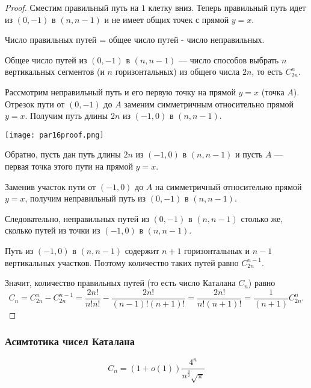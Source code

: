 \begin{proof}

    Сместим правильный путь на $1$ клетку вниз. Теперь правильный путь идет из $(0, -1)$ в $(n, n - 1)$ и не имеет общих точек с прямой $y = x$.

    Число правильных путей = общее число путей - число неправильных.

    Общее число путей из $(0, -1)$ в $(n, n - 1)$ --- число способов выбрать $n$ вертикальных сегментов (и $n$ горизонтальных) из общего числа $2n$, то есть $C_{2n}^n$.

    Рассмотрим неправильный путь и его первую точку на прямой $y = x$ (точка $A$). Отрезок пути от $(0, -1)$ до $A$ заменим симметричным относительно прямой $y = x$. Получим путь длины $2n$ из $(-1, 0)$ в $(n, n - 1)$.

    \begin{center}
        \texttt{[image: par16proof.png]}
    \end{center}

    Обратно, пусть дан путь длины $2n$ из $(-1, 0)$ в $(n, n - 1)$ и пусть $A$ --- первая точка этого пути на прямой $y = x$. 

    Заменив участок пути от $(-1, 0)$ до $A$ на симметричный относительно прямой $y = x$, получим неправильный путь из $(0, -1)$ в $(n, n - 1)$.

    Следовательно, неправильных путей из $(0, -1)$ в $(n, n - 1)$ столько же, сколько путей из точки из $(-1, 0)$ в $(n, n - 1)$.

    Путь из $(-1, 0)$ в $(n, n - 1)$ содержит $n + 1$ горизонтальных и $n - 1$ вертикальных участков. Поэтому количество таких путей равно $C_{2n}^{n - 1}$.

    Значит, количество правильных путей (то есть число Каталана $C_n$) равно \[ C_n = C_{2n}^n - C_{2n}^{n - 1} = \frac{2n!}{n!n!} - \frac{2n!}{(n - 1)!(n + 1)!} = \frac{2n!}{n!(n + 1)!} = \frac{1}{(n + 1)} C_{2n}^n. \]

\end{proof}

\subsubsection*{Асимтотика чисел Каталана}

\begin{theorem}
    
    \[ C_n = (1 + o(1)) \frac{4^n}{n^{\frac{3}{2}} \sqrt{\pi}} \]

\end{theorem}

